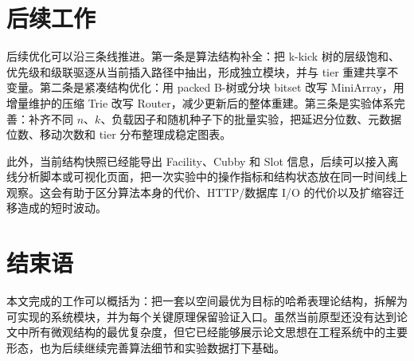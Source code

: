 \section{后续工作}
后续优化可以沿三条线推进。第一条是算法结构补全：把 k-kick 树的层级饱和、优先级和级联驱逐从当前插入路径中抽出，形成独立模块，并与 tier 重建共享不变量。第二条是紧凑结构优化：用 packed B-树或分块 bitset 改写 MiniArray，用增量维护的压缩 Trie 改写 Router，减少更新后的整体重建。第三条是实验体系完善：补齐不同 \(n\)、\(k\)、负载因子和随机种子下的批量实验，把延迟分位数、元数据位数、移动次数和 tier 分布整理成稳定图表。

此外，当前结构快照已经能导出 Facility、Cubby 和 Slot 信息，后续可以接入离线分析脚本或可视化页面，把一次实验中的操作指标和结构状态放在同一时间线上观察。这会有助于区分算法本身的代价、HTTP/数据库 I/O 的代价以及扩缩容迁移造成的短时波动。

\section{结束语}
本文完成的工作可以概括为：把一套以空间最优为目标的哈希表理论结构，拆解为可实现的系统模块，并为每个关键原理保留验证入口。虽然当前原型还没有达到论文中所有微观结构的最优复杂度，但它已经能够展示论文思想在工程系统中的主要形态，也为后续继续完善算法细节和实验数据打下基础。